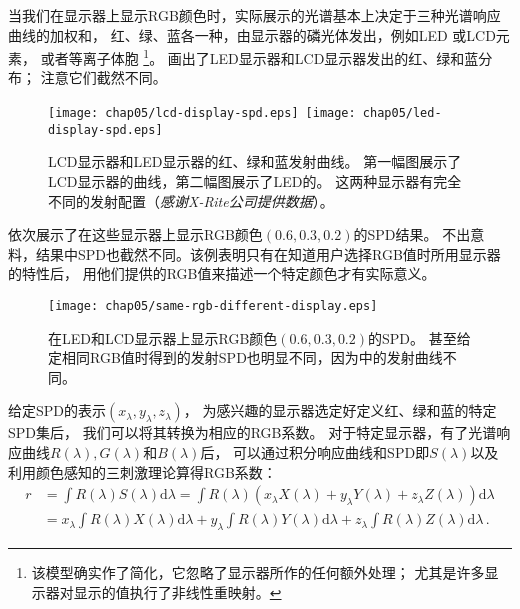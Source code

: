 当我们在显示器上显示RGB颜色时，实际展示的光谱基本上决定于三种光谱响应曲线的加权和，
红、绿、蓝各一种，由显示器的磷光体发出，例如LED
或LCD元素，
或者等离子体胞
\footnote{该模型确实作了简化，它忽略了显示器所作的任何额外处理；
    尤其是许多显示器对显示的值执行了非线性重映射。}。
画出了LED显示器和LCD显示器发出的红、绿和蓝分布；
注意它们截然不同。
\begin{figure}[htbp]
    \centering\texttt{[image: chap05/lcd-display-spd.eps]}\,
    \texttt{[image: chap05/led-display-spd.eps]}
    \caption{LCD显示器和LED显示器的红、绿和蓝发射曲线。
    第一幅图展示了LCD显示器的曲线，第二幅图展示了LED的。
    这两种显示器有完全不同的发射配置（{\itshape 感谢X-Rite公司提供数据}）。}
    \label{fig:5.4}
\end{figure}

依次展示了在这些显示器上显示RGB颜色$(0.6,0.3,0.2)$的SPD结果。
不出意料，结果中SPD也截然不同。该例表明只有在知道用户选择RGB值时所用显示器的特性后，
用他们提供的RGB值来描述一个特定颜色才有实际意义。
\begin{figure}[htbp]
    \centering\texttt{[image: chap05/same-rgb-different-display.eps]}
    \caption{在LED和LCD显示器上显示RGB颜色$(0.6,0.3,0.2)$的SPD。
        甚至给定相同RGB值时得到的发射SPD也明显不同，因为中的发射曲线不同。}
    \label{fig:5.5}
\end{figure}

给定SPD的表示$(x_{\lambda},y_{\lambda},z_{\lambda})$，
为感兴趣的显示器选定好定义红、绿和蓝的特定SPD集后，
我们可以将其转换为相应的RGB系数。
对于特定显示器，有了光谱响应曲线$R(\lambda),G(\lambda)$和$B(\lambda)$后，
可以通过积分响应曲线和SPD即$S(\lambda)$以及利用颜色感知的三刺激理论算得RGB系数：
\begin{align*}
    r & =\int R(\lambda)S(\lambda)\mathrm{d}\lambda=\int R(\lambda)(x_{\lambda}X(\lambda)+y_{\lambda}Y(\lambda)+z_{\lambda}Z(\lambda))\mathrm{d}\lambda                        \\
      & =x_{\lambda}\int R(\lambda)X(\lambda)\mathrm{d}\lambda+y_{\lambda}\int R(\lambda)Y(\lambda)\mathrm{d}\lambda+z_{\lambda}\int R(\lambda)Z(\lambda)\mathrm{d}\lambda\, .
\end{align*}

